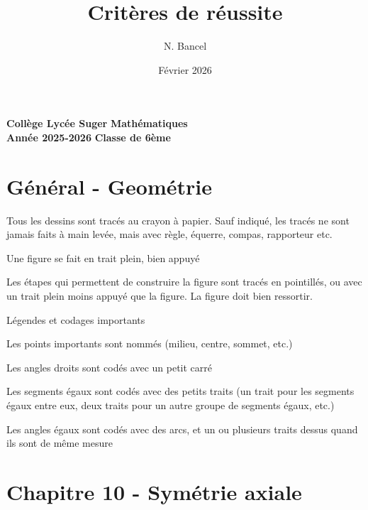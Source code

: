\documentclass{exam}
\title{Critères de réussite}
\author{N. Bancel}
\date{Février 2026}
\begin{document}
\textbf{Collège Lycée Suger}
\hfill
\textbf{Mathématiques} \\

\textbf{Année 2025-2026}
\hfill
\textbf{Classe de 6ème} \par

{\let\newpage\relax\maketitle}

\section{Général - Geométrie}

\begin{Indication}

\begin{compactitem}
  \item Tous les dessins sont tracés au crayon à papier. Sauf indiqué, les tracés ne sont jamais faits à main levée, mais avec règle, équerre, compas, rapporteur etc.
  \item Une figure se fait en trait plein, bien appuyé
  \item Les étapes qui permettent de construire la figure sont tracés en pointillés, ou avec un trait plein moins appuyé que la figure. La figure doit bien ressortir.
  \item Légendes et codages importants
  \begin{compactitem}
    \item Les points importants sont nommés (milieu, centre, sommet, etc.)
    \item Les angles droits sont codés avec un petit carré
    \item Les segments égaux sont codés avec des petits traits (un trait pour les segments égaux entre eux, deux traits pour un autre groupe de segments égaux, etc.)
    \item Les angles égaux sont codés avec des arcs, et un ou plusieurs traits dessus quand ils sont de même mesure
\end{compactitem}
\end{compactitem}

\end{Indication}


\section{Chapitre 10 - Symétrie axiale}
\end{document}
